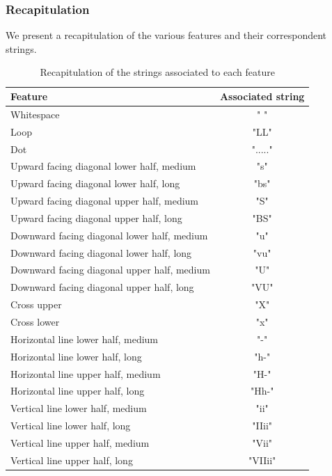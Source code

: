 \subsubsection*{Recapitulation}
We present a recapitulation of the various features and their correspondent strings.
\begin{table}[!htbp]
\centering
\footnotesize
\begin{tabular}{|l | c |} 
 \hline  \multicolumn{1}{|p{2cm}|}{\bfseries Feature}
 & \multicolumn{1}{p{2cm}|}{\centering\bfseries Associated string} \\ [0.5ex] 
 \hline\hline
 Whitespace & " " \\ \hline
 Loop & "LL"\\\hline
 Dot & "....."\\ \hline
 Upward facing diagonal lower half, medium & "s" \\ \hline
 Upward facing diagonal lower half, long & "bs"  \\\hline
 Upward facing diagonal upper half, medium & "S" \\ \hline
 Upward facing diagonal upper half, long & "BS" \\\hline
 Downward facing diagonal lower half, medium& "u"\\ \hline
 Downward facing diagonal lower half, long &"vu" \\ \hline
 Downward facing diagonal upper half, medium& "U" \\\hline
 Downward facing diagonal upper half, long &"VU" \\\hline
 Cross upper & "X"\\\hline
 Cross lower & "x"\\\hline
 Horizontal line lower half, medium & "-"\\\hline
  Horizontal line lower half, long & "h-"\\\hline
   Horizontal line upper half, medium & "H-"\\\hline
    Horizontal line upper half, long & "Hh-"\\\hline
 Vertical line lower half, medium & "ii"\\\hline
  Vertical line lower half, long & "IIii"\\\hline
   Vertical line upper half, medium & "Vii"\\\hline
    Vertical line upper half, long & "VIIii"\\ 
 \hline
\end{tabular}
\caption{Recapitulation of the strings associated to each feature}
\label{features}
\end{table}



